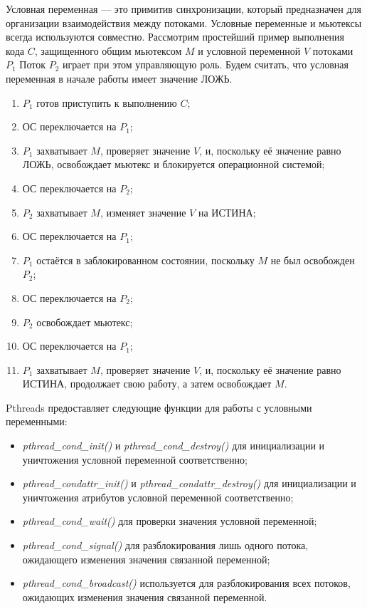 Условная переменная --- это примитив синхронизации,
который предназначен для организации взаимодействия между потоками.
Условные переменные и мьютексы всегда используются совместно.
Рассмотрим простейший пример выполнения кода \( C \),
защищенного общим мьютексом \( M \) и условной переменной \( V \)
потоками \( P_1 \) Поток \( P_2 \) играет при этом управляющую роль.
Будем считать, что условная переменная в начале работы имеет значение ЛОЖЬ.
\begin{enumerate}
\item \( P_1 \) готов приступить к выполнению \( C \);
\item ОС переключается на \( P_1 \);
\item \( P_1 \) захватывает \( M \), проверяет значение \( V \), и,
  поскольку её значение равно ЛОЖЬ, освобождает мьютекс и блокируется операционной системой;
\item ОС переключается на \( P_2 \);
\item \( P_2 \) захватывает \( M \), изменяет значение \( V \) на ИСТИНА;
\item ОС переключается на \( P_1 \);
\item \( P_1 \) остаётся в заблокированном состоянии, поскольку \( M \) не был освобожден \( P_2 \);
\item ОС переключается на \( P_2 \);
\item \( P_2 \) освобождает мьютекс;
\item ОС переключается на \( P_1 \);
\item \( P_1 \) захватывает \( M \), проверяет значение \( V \), и,
  поскольку её значение равно ИСТИНА, продолжает свою работу, а затем освобождает \( M \).
\end{enumerate}

Pthreads предоставляет следующие функции для работы с условными переменными:
\begin{itemize}
\item \textit{pthread\_cond\_init()} и \textit{pthread\_cond\_destroy()}
  для инициализации и уничтожения условной переменной соответственно;
\item \textit{pthread\_condattr\_init()} и \textit{pthread\_condattr\_destroy()}
  для инициализации и уничтожения атрибутов условной переменной соответственно;
\item \textit{pthread\_cond\_wait()} для проверки значения условной переменной;
\item \textit{pthread\_cond\_signal()} для разблокирования лишь одного потока,
  ожидающего изменения значения связанной переменной;
\item \textit{pthread\_cond\_broadcast()} используется для разблокирования всех потоков,
  ожидающих изменения значения связанной переменной.
\end{itemize}

